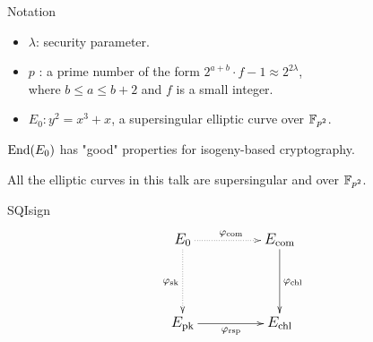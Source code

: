
\begin{frame}{Notation}
    \begin{itemize}
        \setlength{\itemsep}{10pt}
        \item $\lambda$: security parameter.
        \item $p$ : a prime number of the form $2^{a + b} \cdot f - 1 \approx 2^{2\lambda}$,\\[3pt]
                where $b \leq a \leq b + 2$ and $f$ is a small integer.
        \item $E_0 : y^2 = x^3 + x$, a supersingular elliptic curve over $\mathbb{F}_{p^2}$.
    \end{itemize}

    \vspace{10pt}
    $\mathrm{End}(E_0)$ has "good" properties for isogeny-based cryptography.

    \vspace{20pt}
    All the elliptic curves in this talk are supersingular and over $\mathbb{F}_{p^2}$.
\end{frame}

\begin{frame}{SQIsign}
    \begin{equation*}
        \large
        \xymatrix@C=50pt@R=50pt{
            E_0 \ar@{..>}[d]_{\varphi_\mathrm{sk}} \ar@{..>}[r]^{\varphi_{\mathrm{com}}}
                & E_{\mathrm{com}} \ar[d]^{\varphi_\mathrm{chl}}\\
            E_{\mathrm{pk}} \ar[r]_{\varphi_\mathrm{rsp}} & E_{\mathrm{chl}}
        }
    \end{equation*}
\end{frame}

